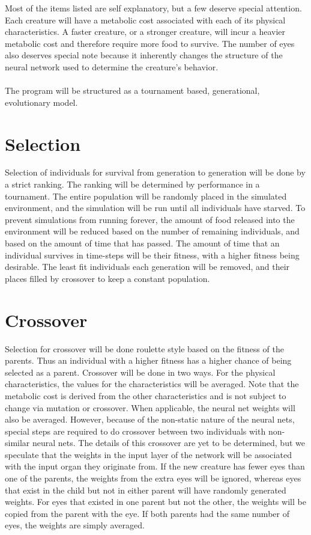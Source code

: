 \documentclass[paper=a4, fontsize=11pt]{scrartcl} %
\numberwithin{equation}{section} %
\numberwithin{figure}{section} %
\numberwithin{table}{section} %
\begin{document}
Most of the items listed are self explanatory, but a few deserve special attention. Each creature will have a metabolic cost associated with each of its physical characteristics. A faster creature, or a stronger creature, will incur a heavier metabolic cost and therefore require more food to survive. The number of eyes also deserves special note because it inherently changes the structure of the neural network used to determine the creature's behavior.
\\
\\
The program will be structured as a tournament based, generational, evolutionary model.

\section*{Selection}

Selection of individuals for survival from generation to generation will be done by a strict ranking. The ranking will be determined by performance in a tournament. The entire population will be randomly placed in the simulated environment, and the simulation will be run until all individuals have starved. To prevent simulations from running forever, the amount of food released into the environment will be reduced based on the number of remaining individuals, and based on the amount of time that has passed. The amount of time that an individual survives in time-steps will be their fitness, with a higher fitness being desirable. The least fit individuals each generation will be removed, and their places filled by crossover to keep a constant population.

\section*{Crossover}

Selection for crossover will be done roulette style based on the fitness of the parents. Thus an individual with a higher fitness has a higher chance of being selected as a parent. Crossover will be done in two ways. For the physical characteristics, the values for the characteristics will be averaged. Note that the metabolic cost is derived from the other characteristics and is not subject to change via mutation or crossover. When applicable, the neural net weights will also be averaged. However, because of the non-static nature of the neural nets, special steps are required to do crossover between two individuals with non-similar neural nets. The details of this crossover are yet to be determined, but we speculate that the weights in the input layer of the network will be associated with the input organ they originate from. If the new creature has fewer eyes than one of the parents, the weights from the extra eyes will be ignored, whereas eyes that exist in the child but not in either parent will have randomly generated weights. For eyes that existed in one parent but not the other, the weights will be copied from the parent with the eye. If both parents had the same number of eyes, the weights are simply averaged.
\end{document}
